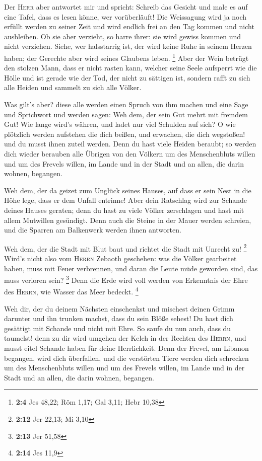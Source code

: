  Der \textsc{Herr} aber antwortet mir und spricht: Schreib
das Gesicht und male es auf eine Tafel, dass es lesen könne, wer
vorüberläuft!  Die Weissagung wird ja noch erfüllt werden
zu seiner Zeit und wird endlich frei an den Tag kommen und nicht
ausbleiben. Ob sie aber verzieht, so harre ihrer: sie wird gewiss kommen
und nicht verziehen.  Siehe, wer halsstarrig ist, der wird
keine Ruhe in seinem Herzen haben; der Gerechte aber wird seines
Glaubens leben. \footnote{\textbf{2:4} Jes 48,22; Röm 1,17; Gal 3,11;
  Hebr 10,38}  Aber der Wein betrügt den stolzen Mann,
dass er nicht rasten kann, welcher seine Seele aufsperrt wie die Hölle
und ist gerade wie der Tod, der nicht zu sättigen ist, sondern rafft zu
sich alle Heiden und sammelt zu sich alle Völker.

 Was gilt's aber? diese alle werden einen Spruch von ihm
machen und eine Sage und Sprichwort und werden sagen: Weh dem, der sein
Gut mehrt mit fremdem Gut! Wie lange wird's währen, und ladet nur viel
Schulden auf sich?  O wie plötzlich werden aufstehen die
dich beißen, und erwachen, die dich wegstoßen! und du musst ihnen zuteil
werden.  Denn du hast viele Heiden beraubt; so werden dich
wieder berauben alle Übrigen von den Völkern um des Menschenbluts willen
und um des Frevels willen, im Lande und in der Stadt und an allen, die
darin wohnen, begangen.

 Weh dem, der da geizet zum Unglück seines Hauses, auf
dass er sein Nest in die Höhe lege, dass er dem Unfall entrinne!
 Aber dein Ratschlag wird zur Schande deines Hauses
geraten; denn du hast zu viele Völker zerschlagen und hast mit allem
Mutwillen gesündigt.  Denn auch die Steine in der Mauer
werden schreien, und die Sparren am Balkenwerk werden ihnen antworten.

 Weh dem, der die Stadt mit Blut baut und richtet die
Stadt mit Unrecht zu! \footnote{\textbf{2:12} Jer 22,13; Mi 3,10}
 Wird's nicht also vom \textsc{Herrn} Zebaoth geschehen:
was die Völker gearbeitet haben, muss mit Feuer verbrennen, und daran
die Leute müde geworden sind, das muss verloren sein? \footnote{\textbf{2:13}
  Jer 51,58}  Denn die Erde wird voll werden von
Erkenntnis der Ehre des \textsc{Herrn}, wie Wasser das Meer bedeckt.
\footnote{\textbf{2:14} Jes 11,9}

 Weh dir, der du deinem Nächsten einschenkst und mischest
deinen Grimm darunter und ihn trunken machst, dass du sein Blöße sehest!
 Du hast dich gesättigt mit Schande und nicht mit Ehre.
So saufe du nun auch, dass du taumelst! denn zu dir wird umgehen der
Kelch in der Rechten des \textsc{Herrn}, und musst eitel Schande haben
für deine Herrlichkeit.  Denn der Frevel, am Libanon
begangen, wird dich überfallen, und die verstörten Tiere werden dich
schrecken um des Menschenbluts willen und um des Frevels willen, im
Lande und in der Stadt und an allen, die darin wohnen, begangen.

